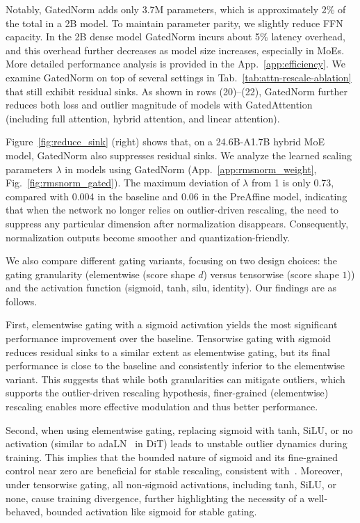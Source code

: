 \documentclass{article} %
\begin{document}
Notably, GatedNorm adds only 3.7M parameters, which is approximately 2\% of the total in a 2B model. 
To maintain parameter parity, we slightly reduce FFN capacity. 
In the 2B dense model GatedNorm incurs about 5\% latency overhead, and this overhead further decreases as model size increases, especially in MoEs. 
More detailed performance analysis is provided in the App.~\ref{app:efficiency}.
We examine GatedNorm on top of several settings in Tab.~\ref{tab:attn-rescale-ablation} that still exhibit residual sinks. 
As shown in rows (20)–(22), GatedNorm further reduces both loss and outlier magnitude of models with GatedAttention (including full attention, hybrid attention, and linear attention).

Figure~\ref{fig:reduce_sink} (right) shows that, on a 24.6B-A1.7B hybrid MoE model, GatedNorm also suppresses residual sinks. 
We analyze the learned scaling parameters \(\lambda\) in models using GatedNorm (App.~\ref{app:rmsnorm_weight}, Fig.~\ref{fig:rmsnorm_gated}). 
The maximum deviation of \(\lambda\) from 1 is only 0.73, compared with 0.004 in the baseline and 0.06 in the PreAffine model, indicating that when the network no longer relies on outlier-driven rescaling, the need to suppress any particular dimension after normalization disappears. 
Consequently, normalization outputs become smoother and quantization-friendly.


We also compare different gating variants, focusing on two design choices: the gating granularity (elementwise (score shape $d$) versus tensorwise (score shape $1$)) and the activation function (sigmoid, tanh, silu, identity). Our findings are as follows.

First, elementwise gating with a sigmoid activation yields the most significant performance improvement over the baseline. 
Tensorwise gating with sigmoid reduces residual sinks to a similar extent as elementwise gating, but its final performance is close to the baseline and consistently inferior to the elementwise variant. 
This suggests that while both granularities can mitigate outliers, which supports the outlier-driven rescaling hypothesis, finer-grained (elementwise) rescaling enables more effective modulation and thus better performance.

Second, when using elementwise gating, replacing sigmoid with tanh, SiLU, or no activation (similar to adaLN~\citep{perez2018film,xu2019understanding,peebles2023scalable,karras2024analyzing} in DiT) leads to unstable outlier dynamics during training. 
This implies that the bounded nature of sigmoid and its fine-grained control near zero are beneficial for stable rescaling, consistent with~\citet{chen2025stronger}. Moreover, under tensorwise gating, all non-sigmoid activations, including tanh, SiLU, or none, cause training divergence, further highlighting the necessity of a well-behaved, bounded activation like sigmoid for stable gating.
\end{document}
